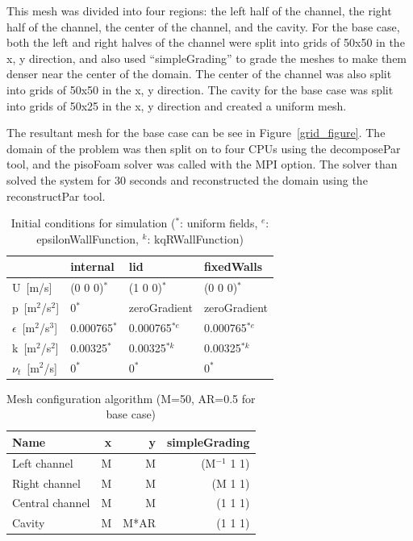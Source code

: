 \documentclass[twocolumn,10pt]{asme2ej}
\begin{document}
This mesh was divided into four regions: the left half of the channel, the right half of the channel, the center of the channel, and the cavity. For the base case, both the left and right halves of the channel were split into grids of 50x50 in the x, y direction, and also used ``simpleGrading'' to grade the meshes to make them denser near the center of the domain. The center of the channel was also split into grids of 50x50 in the x, y direction. The cavity for the base case was split into grids of 50x25 in the x, y direction and created a uniform mesh.

The resultant mesh for the base case can be see in Figure~\ref{grid_figure}. The domain of the problem was then split on to four CPUs using the decomposePar tool, and the pisoFoam solver was called with the MPI option. The solver than solved the system for 30 seconds and reconstructed the domain using the reconstructPar tool.

\begin{table}[bt]
\begin{center}
\begin{tabular}{| l | l | l | l | }
\hline
                         & internal     & lid          & fixedWalls   \\
\hline
U~[m/s]                  & (0 0 0)$^*$  & (1 0 0)$^*$  & (0 0 0)$^*$  \\
p~[m$^2$/s$^2$]          & 0$^*$        & zeroGradient & zeroGradient \\
$\epsilon$~[m$^2$/s$^3$] & 0.000765$^*$ & 0.000765$^{*e}$ & 0.000765$^{*e}$ \\
k~[m$^2$/s$^2$]          & 0.00325$^*$  & 0.00325$^{*k}$  & 0.00325$^{*k}$  \\
$\nu_t$~[m$^2$/s]        & 0$^*$        & 0$^*$        & 0$^*$        \\
\hline
\end{tabular}
\caption{Initial conditions for simulation ($^*$: uniform fields, $^e$: epsilonWallFunction, $^k$: kqRWallFunction)}
\label{initial_conditions}
\end{center}
\end{table}

\begin{table}[bt]
\begin{center}
\begin{tabular}{| l | r r r | }
\hline
Name          & x  &  y & simpleGrading \\
\hline
Left channel    & M &  M    & (M$^{-1}$ 1 1) \\
Right channel   & M &  M    & (M        1 1) \\
Central channel & M &  M    & (1        1 1) \\
Cavity          & M &  M*AR & (1        1 1) \\
\hline
\end{tabular}
\caption{Mesh configuration algorithm (M=50, AR=0.5 for base case)}
\label{mesh_generation}
\end{center}
\end{table}
\end{document}
